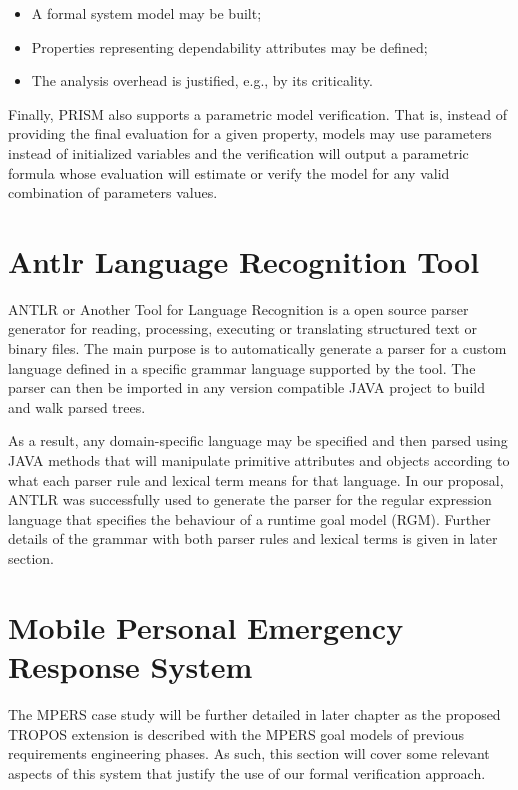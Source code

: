 \begin{itemize}

\item A formal system model may be built;
\medskip

\item Properties representing dependability attributes may be defined;
\medskip

\item The analysis overhead is justified, e.g., by its criticality.
\bigskip

\end{itemize}

Finally, PRISM also supports a parametric model verification. That is, instead of providing the final evaluation for a given property, models may use parameters instead of initialized variables and the verification will output a parametric formula whose evaluation will estimate or verify the model for any valid combination of parameters values.

\section{Antlr Language Recognition Tool}

ANTLR or Another Tool for Language Recognition is a open source parser generator for reading, processing, executing or translating structured text or binary files. The main purpose is to automatically generate a parser for a custom language defined in a specific grammar language supported by the tool. The parser can then be imported in any version compatible JAVA project to build and walk parsed trees. 

As a result, any domain-specific language may be specified and then parsed using JAVA methods that will manipulate primitive attributes and objects according to what each parser rule and lexical term means for that language. In our proposal, ANTLR was successfully used to generate the parser for the regular expression language that specifies the behaviour of a runtime goal model (RGM). Further details of the grammar with both parser rules and lexical terms is given in later section.


\section{Mobile Personal Emergency Response System}

The MPERS case study will be further detailed in later chapter as the proposed TROPOS extension is described with the MPERS goal models of previous requirements engineering phases. As such, this section will cover some relevant aspects of this system that justify the use of our formal verification approach.

